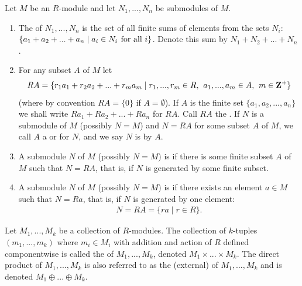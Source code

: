     \begin{definition}\label{def:-properties-module-sums}
        Let $M$ be an $R$-module and let $N_1,...,N_n$ be submodules of $M$.
        \begin{enumerate}[label = (\arabic*)]
            \item The  of $N_1,...,N_n$ is the set of all finite sums of elements from the sets $N_i$: $\{a_1 + a_2 + ... + a_n \mid a_i \in N_i \hskip0.4em\relax \text{for all }i\}$. Denote this sum by $N_1 + N_2 + ... + N_n$.
            \item For any subset $A$ of $M$ let
            \begin{equation*}
            \begin{split}
                RA = \{r_1 a_1 + r_2 a_2 + ... + r_m a_m \mid r_1,...,r_m \in R,\hskip0.4em\relax a_1,...,a_m \in A,\hskip0.4em\relax m \in \mathbf{Z}^{+}\}
            \end{split}
            \end{equation*}
            (where by convention $RA = \{0\}$ if $A = \emptyset$). If $A$ is the finite set $\{a_1,a_2,...,a_n\}$ we shall write $Ra_1 + Ra_2 + ... + Ra_n$ for $RA$. Call $RA$ the . If $N$ is a submodule of $M$ (possibly $N = M$) and $N=RA$ for some subset $A$ of $M$, we call $A$ a  or  for $N$, and we say $N$ is  by $A$.
            \item A submodule $N$ of $M$ (possibly $N=M$) is  if there is some finite subset $A$ of $M$ such that $N = RA$, that is, if $N$ is generated by some finite subset.
            \item A submodule $N$ of $M$ (possibly $N=M$) is  if there exists an element $a \in M$ such that $N = Ra$, that is, if $N$ is generated by one element:
            \begin{equation*}
            \begin{split}
                N = RA = \{ra \mid r \in R\}.
            \end{split}
            \end{equation*}
        \end{enumerate}
    \end{definition}

    \begin{definition}\label{def:external-direct-sum}
        Let $M_1,...,M_k$ be a collection of $R$-modules. The collection of $k$-tuples $(m_1,...,m_k)$ where $m_i \in M_i$ with addition and action of $R$ defined componentwise is called the  of $M_1,...,M_k$, denoted $M_1 \times ... \times M_k$. The direct product of $M_1,...,M_k$ is also referred to as the (external)  of $M_1,...,M_k$ and is denoted $M_1 \oplus ... \oplus M_k$.
    \end{definition}

